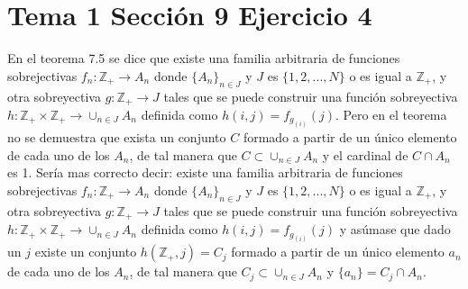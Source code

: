\documentclass{article}
\begin{document}
\section{Tema 1 Sección 9 Ejercicio 4}
En el teorema 7.5 se dice que existe una familia arbitraria de funciones sobrejectivas $f_n:\mathbb{Z}_{+}\rightarrow A_n$ donde $\{A_n\}_{n\in J}$ y $J$ es $\{1,2,...,N\}$ o es igual a $\mathbb{Z}_{+}$, y otra sobreyectiva $g:\mathbb{Z}_{+}\rightarrow J$ tales que se puede construir una función sobreyectiva $h:\mathbb{Z}_{+}\times \mathbb{Z}_{+}\rightarrow \cup_{n\in J}A_n$ definida como $h(i, j)=f_{g_(i)}(j)$. Pero en el teorema no se demuestra que exista un conjunto $C$ formado a partir de un único elemento de cada uno de los $A_n$, de tal manera que $C\subset \cup_{n\in J}A_n$ y el cardinal de $C\cap A_n$ es 1. Sería mas correcto decir: existe una familia arbitraria de funciones sobrejectivas $f_n:\mathbb{Z}_{+}\rightarrow A_n$ donde $\{A_n\}_{n\in J}$ y $J$ es $\{1,2,...,N\}$ o es igual a $\mathbb{Z}_{+}$, y otra sobreyectiva $g:\mathbb{Z}_{+}\rightarrow J$ tales que se puede construir una función sobreyectiva $h:\mathbb{Z}_{+}\times \mathbb{Z}_{+}\rightarrow \cup_{n\in J}A_n$ definida como $h(i, j)=f_{g_(i)}(j)$ y asúmase que dado un $j$ existe un conjunto $h(\mathbb{Z}_{+},j)=C_j$ formado a partir de un único elemento $a_n$ de cada uno de los $A_n$, de tal manera que $C_j\subset \cup_{n\in J}A_n$ y $\{a_n\}=C_j\cap A_n$.
\end{document}
